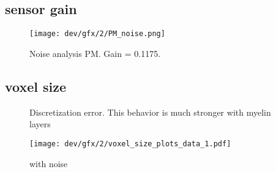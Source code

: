 \subsection{sensor gain}
%
\begin{figure}[!t]
\centering
\texttt{[image: dev/gfx/2/PM\_noise.png]}
\caption[Noise analysis]{Noise analysis PM. Gain = 0.1175. }
\label{fig:parameterModelSimGain}
\end{figure}
% 
% 
% 
\subsection{voxel size}
% 
\begin{figure}[!t]
\centering
\resizebox{1.0\textwidth}{!}{
\tikzset{external/export=false}
}
\caption[Discretization error]{Discretization error.
This behavior is much stronger with myelin layers}
\label{fig:vectorfield_disc_error}
\end{figure}
% 
% 
\begin{figure}[p]
\centering
\texttt{[image: dev/gfx/2/voxel\_size\_plots\_data\_1.pdf]}
\caption[voxel size model with noise]{with noise \dummy{}}
\label{fig:voxelsizeNoise}
\end{figure}
% 
% 
% 
